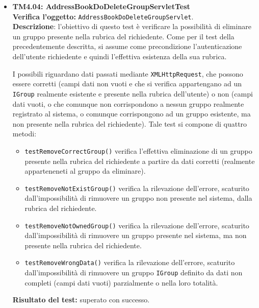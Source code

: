 \begin{itemize}
\item \textbf{TM4.04: AddressBookDoDeleteGroupServletTest}\\
\textbf{Verifica l'oggetto:} \texttt{AddressBookDoDeleteGroupServlet}.\\
\textbf{Descrizione}: l'obiettivo di questo test è verificare la possibilità di eliminare un gruppo presente nella rubrica del richiedente. Come per il test della  precedentemente descritta, si assume come precondizione l'autenticazione dell'utente richiedente e quindi l'effettiva esistenza della sua rubrica.

I possibili  riguardano dati passati mediante \texttt{XMLHttpRequest}, che possono essere corretti (campi dati non vuoti e che si verifica appartengano ad un \texttt{IGroup} realmente esistente e presente nella rubrica dell'utente) o non (campi dati vuoti, o che comunque non corrispondono a nessun gruppo realmente registrato al sistema, o comunque corrispongono ad un gruppo esistente, ma non presente nella rubrica del richiedente).
Tale test si compone di quattro metodi:
\begin{itemize}
\item \texttt{testRemoveCorrectGroup()} verifica l'effettiva eliminazione di un gruppo presente nella rubrica del richiedente a partire da dati corretti (realmente apparteneneti al gruppo da eliminare).
\item \texttt{testRemoveNotExistGroup()} verifica la rilevazione dell'errore, scaturito dall'impossibilità di rimuovere un gruppo non presente nel sistema, dalla rubrica del richiedente.
\item \texttt{testRemoveNotOwnedGroup()} verifica la rilevazione dell'errore, scaturito dall'impossibilità di rimuovere un gruppo presente nel sistema, ma non presente nella rubrica del richiedente. 
\item \texttt{testRemoveWrongData()} verifica la rilevazione dell'errore, scaturito dall'impossibilità di rimuovere un gruppo \texttt{IGroup} definito da dati non completi (campi dati vuoti) parzialmente o nella loro totalità.
\end{itemize}
\textbf{Risultato del test:} superato con successo.


\end{itemize}
